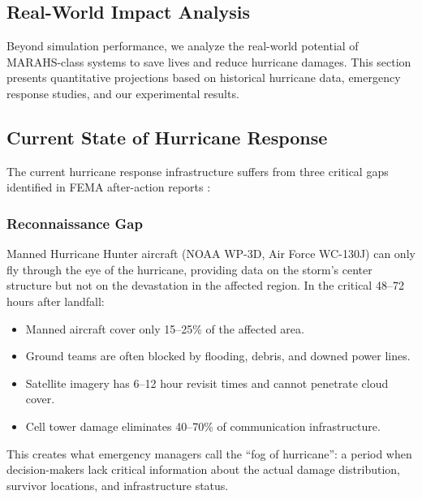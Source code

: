 \documentclass[12pt,a4paper,twocolumn]{article}
\begin{document}
\begin{enumerate}[leftmargin=*]
\section{Real-World Impact Analysis}
\label{sec:impact_analysis}

Beyond simulation performance, we analyze the real-world potential of MARAHS-class systems to save lives and reduce hurricane damages. This section presents quantitative projections based on historical hurricane data, emergency response studies, and our experimental results.

\subsection{Current State of Hurricane Response}
\label{sec:current_state}

The current hurricane response infrastructure suffers from three critical gaps identified in FEMA after-action reports \citep{FEMA2019}:

\subsubsection{Reconnaissance Gap}
Manned Hurricane Hunter aircraft (NOAA WP-3D, Air Force WC-130J) can only fly through the eye of the hurricane, providing data on the storm's center structure but not on the devastation in the affected region. In the critical 48--72 hours after landfall:
\begin{itemize}[leftmargin=*]
    \item Manned aircraft cover only 15--25\% of the affected area.
    \item Ground teams are often blocked by flooding, debris, and downed power lines.
    \item Satellite imagery has 6--12 hour revisit times and cannot penetrate cloud cover.
    \item Cell tower damage eliminates 40--70\% of communication infrastructure.
\end{itemize}

This creates what emergency managers call the ``fog of hurricane'': a period when decision-makers lack critical information about the actual damage distribution, survivor locations, and infrastructure status.


\end{enumerate}
\end{document}
